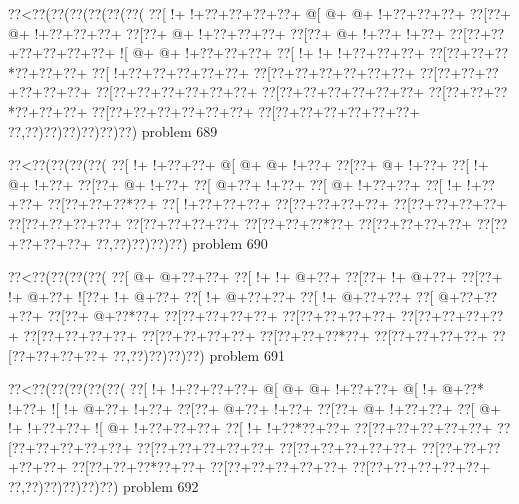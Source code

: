 \vbox{\vbox{\goo
\0??<\0??(\0??(\0??(\0??(\0??(\0??(
\0??[\- !+\- !+\0??+\0??+\0??+\0??+
\- @[\- @+\- @+\- !+\0??+\0??+\0??+
\0??[\0??+\- @+\- !+\0??+\0??+\0??+
\0??[\0??+\- @+\- !+\0??+\0??+\0??+
\0??[\0??+\- @+\- !+\0??+\- !+\0??+
\0??[\0??+\0??+\0??+\0??+\0??+\0??+
\- ![\- @+\- @+\- !+\0??+\0??+\0??+
\0??[\- !+\- !+\- !+\0??+\0??+\0??+
\0??[\0??+\0??+\0??*\0??+\0??+\0??+
\0??[\- !+\0??+\0??+\0??+\0??+\0??+
\0??[\0??+\0??+\0??+\0??+\0??+\0??+
\0??[\0??+\0??+\0??+\0??+\0??+\0??+
\0??[\0??+\0??+\0??+\0??+\0??+\0??+
\0??[\0??+\0??+\0??+\0??+\0??+\0??+
\0??[\0??+\0??+\0??*\0??+\0??+\0??+
\0??[\0??+\0??+\0??+\0??+\0??+\0??+
\0??[\0??+\0??+\0??+\0??+\0??+\0??+
\0??,\0??)\0??)\0??)\0??)\0??)\0??)
}
\hfil problem 689\hfil\break
}

\vbox{\vbox{\goo
\0??<\0??(\0??(\0??(\0??(
\0??[\- !+\- !+\0??+\0??+
\- @[\- @+\- @+\- !+\0??+
\0??[\0??+\- @+\- !+\0??+
\0??[\- !+\- @+\- !+\0??+
\0??[\0??+\- @+\- !+\0??+
\0??[\- @+\0??+\- !+\0??+
\0??[\- @+\- !+\0??+\0??+
\0??[\- !+\- !+\0??+\0??+
\0??[\0??+\0??+\0??*\0??+
\0??[\- !+\0??+\0??+\0??+
\0??[\0??+\0??+\0??+\0??+
\0??[\0??+\0??+\0??+\0??+
\0??[\0??+\0??+\0??+\0??+
\0??[\0??+\0??+\0??+\0??+
\0??[\0??+\0??+\0??*\0??+
\0??[\0??+\0??+\0??+\0??+
\0??[\0??+\0??+\0??+\0??+
\0??,\0??)\0??)\0??)\0??)
}
\hfil problem 690\hfil\break
}

\vbox{\vbox{\goo
\0??<\0??(\0??(\0??(\0??(
\0??[\- @+\- @+\0??+\0??+
\0??[\- !+\- !+\- @+\0??+
\0??[\0??+\- !+\- @+\0??+
\0??[\0??+\- !+\- @+\0??+
\- ![\0??+\- !+\- @+\0??+
\0??[\- !+\- @+\0??+\0??+
\0??[\- !+\- @+\0??+\0??+
\0??[\- @+\0??+\0??+\0??+
\0??[\0??+\- @+\0??*\0??+
\0??[\0??+\0??+\0??+\0??+
\0??[\0??+\0??+\0??+\0??+
\0??[\0??+\0??+\0??+\0??+
\0??[\0??+\0??+\0??+\0??+
\0??[\0??+\0??+\0??+\0??+
\0??[\0??+\0??+\0??*\0??+
\0??[\0??+\0??+\0??+\0??+
\0??[\0??+\0??+\0??+\0??+
\0??,\0??)\0??)\0??)\0??)
}
\hfil problem 691\hfil\break
}

\vbox{\vbox{\goo
\0??<\0??(\0??(\0??(\0??(\0??(
\0??[\- !+\- !+\0??+\0??+\0??+
\- @[\- @+\- @+\- !+\0??+\0??+
\- @[\- !+\- @+\0??*\- !+\0??+
\- ![\- !+\- @+\0??+\- !+\0??+
\0??[\0??+\- @+\0??+\- !+\0??+
\0??[\0??+\- @+\- !+\0??+\0??+
\0??[\- @+\- !+\- !+\0??+\0??+
\- ![\- @+\- !+\0??+\0??+\0??+
\0??[\- !+\- !+\0??*\0??+\0??+
\0??[\0??+\0??+\0??+\0??+\0??+
\0??[\0??+\0??+\0??+\0??+\0??+
\0??[\0??+\0??+\0??+\0??+\0??+
\0??[\0??+\0??+\0??+\0??+\0??+
\0??[\0??+\0??+\0??+\0??+\0??+
\0??[\0??+\0??+\0??*\0??+\0??+
\0??[\0??+\0??+\0??+\0??+\0??+
\0??[\0??+\0??+\0??+\0??+\0??+
\0??,\0??)\0??)\0??)\0??)\0??)
}
\hfil problem 692\hfil\break
}


